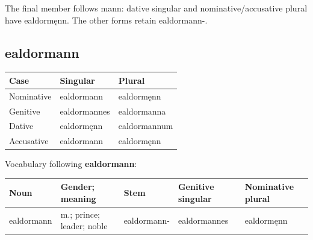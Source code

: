 The final member follows mann: dative singular and nominative/\allowbreak{}accusative plural have ealdormęnn. The other forms retain ealdormann-.

\subsection*{ealdormann}

\par\begingroup
\fontsize{10.5}{13.2}\selectfont
\setlength{\LTleft}{0pt}\setlength{\LTright}{\fill}
\noindent
\begin{tabular}{@{}>{\raggedright\arraybackslash}p{34.82mm}>{\raggedright\arraybackslash}p{41.78mm}>{\raggedright\arraybackslash}p{41.78mm}@{}}
\toprule
\textbf{Case} & \textbf{Singular} & \textbf{Plural} \\
\midrule
Nominative & ealdormann & ealdormęnn \\
Genitive & ealdormannes & ealdormanna \\
Dative & ealdormęnn & ealdormannum \\
Accusative & ealdormann & ealdormęnn \\
\bottomrule
\end{tabular}
\par\endgroup

Vocabulary following \textbf{ealdormann}:

\par\begingroup
\fontsize{10.5}{13.2}\selectfont
\setlength{\LTleft}{0pt}\setlength{\LTright}{\fill}
\noindent
\begin{tabular}{@{}>{\raggedright\arraybackslash}p{20mm}>{\raggedright\arraybackslash}p{23.1mm}>{\raggedright\arraybackslash}p{21mm}>{\raggedright\arraybackslash}p{25.3mm}>{\raggedright\arraybackslash}p{23.35mm}@{}}
\toprule
\textbf{Noun} & \textbf{Gender; meaning} & \textbf{Stem} & \textbf{Genitive singular} & \textbf{Nominative plural} \\
\midrule
ealdormann & m.; prince; leader; noble & ealdormann- & ealdormannes & ealdormęnn \\
\bottomrule
\end{tabular}
\par\endgroup

